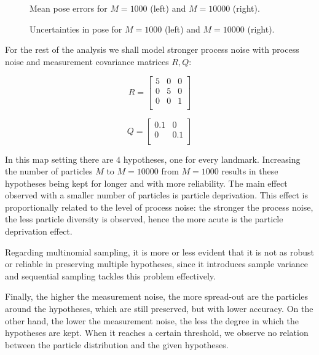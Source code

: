 \begin{figure}
	\centering
	\scalebox{0.5}{}
	\scalebox{0.5}{}
	\caption{Mean pose errors for $M=1000$ (left) and $M=10000$ (right).}
	\label{fig:local_errors_1000_10000}
\end{figure}

\begin{figure}
	\centering
	\scalebox{0.5}{}
	\scalebox{0.5}{}
	\caption{Uncertainties in pose for $M=1000$ (left) and $M=10000$ (right).}
	\label{fig:local_covariances_1000_10000}
\end{figure}


For the rest of the analysis we shall model stronger process noise with process noise and measurement covariance matrices $R,Q$:

	\[
	R =
	\begin{bmatrix}
	    5 		& 0		& 0 \\
	    0	    & 5		& 0 \\
	    0     	& 0 	& 1 \\
	
	\end{bmatrix}
	\]
	
	
	\[
	Q =
	\begin{bmatrix}
	    0.1  & 0 \\
	    0    & 0.1 \\
	
	\end{bmatrix}
	\]
	
	
In this map setting there are $4$ hypotheses, one for every landmark. Increasing the number of particles $M$ to $M=10000$ from $M=1000$ results
in these hypotheses being kept for longer and with more reliability. The main effect observed with a smaller number of particles is particle deprivation. This
effect is proportionally related to the level of process noise: the stronger the process noise, the less particle diversity is observed, hence the more
acute is the particle deprivation effect.

Regarding multinomial sampling, it is more or less evident that it is not as robust or reliable in preserving multiple hypotheses, since it introduces
sample variance and sequential sampling tackles this problem effectively.

Finally, the higher the measurement noise, the more spread-out are the particles around the hypotheses, which are still preserved, but with lower accuracy.
On the other hand, the lower the measurement noise, the less the degree in which the hypotheses are kept. When it reaches a certain threshold, we observe
no relation between the particle distribution and the given hypotheses.


